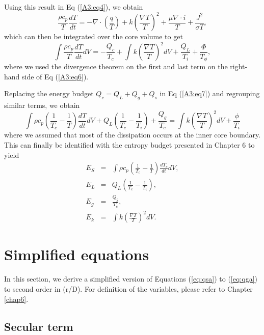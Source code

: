 Using this result in Eq (\ref{A3:eq4}), we obtain
%
\begin{equation}
\frac{\rho c_p}{T} \frac{dT}{dt} = - \nabla \cdot \left(\frac{q}{T}\right) + k \left(\frac{\nabla T}{T}\right)^2
								 + \frac{\mu \nabla \cdot i}{T} + \frac{J^2}{\sigma T},
\label{A3:eq6}
\end{equation}
%
which can then be integrated over the core volume to get
%
\begin{equation}
\int \frac{\rho c_p}{T} \frac{dT}{dt} dV = - \frac{Q_c}{T_c} + \int k \left(\frac{\nabla T}{T}\right)^2 dV
		 + \frac{Q_L}{T_i} + \frac{\Phi}{T_{\phi}},
\label{A3:eq7}
\end{equation}
%
where we used the divergence theorem on the first and last term on the right-hand side of Eq (\ref{A3:eq6}).

Replacing the energy budget $Q_c = Q_L + Q_g + Q_s$ in Eq (\ref{A3:eq7}) and regrouping similar terms, we obtain
%
\begin{equation}
\int \rho c_p \left(\frac{1}{T_c} - \frac{1}{T}\right) \frac{dT}{dt} dV + 
Q_L \left(\frac{1}{T_c}-\frac{1}{T_i}\right) +
\frac{Q_g}{T_c} =
\int k \left(\frac{\nabla T}{T}\right)^2 dV + \frac{\phi}{T_i}
\end{equation}
%
where we assumed that most of the dissipation occurs at the inner core boundary. This can finally be identified
with the entropy budget presented in Chapter 6 to yield 
%
\begin{eqnarray} 
E_S &=& \int \rho c_p \left( \frac{1}{T_c} - \frac{1}{T} \right) \frac{dT_c}{dt}dV, \\ 
E_L &=& Q_L \left( \frac{1}{T_c} - \frac{1}{T_i} \right), \\ 
E_g &=& \frac{Q_g}{T_c}, \\  
E_k &=& \int k \left(\frac{\nabla T}{T}\right)^2 dV. \end{eqnarray}

\section{Simplified equations}

In this section, we derive a simplified version of Equations (\ref{eq:qsa}) to (\ref{eq:qga}) to
second order in (r/D). For definition of the variables, please refer to Chapter \ref{chap6}.

\subsection*{Secular term}

